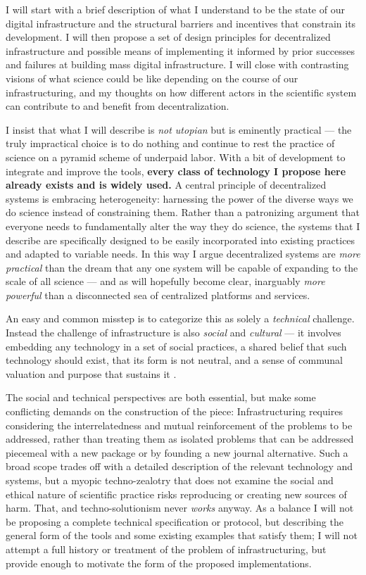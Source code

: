 I will start with a brief description of what I understand to be the
state of our digital infrastructure and the structural barriers and
incentives that constrain its development. I will then propose a set of
design principles for decentralized infrastructure and possible means of
implementing it informed by prior successes and failures at building
mass digital infrastructure. I will close with contrasting visions of
what science could be like depending on the course of our
infrastructuring, and my thoughts on how different actors in the
scientific system can contribute to and benefit from decentralization.

I insist that what I will describe is \emph{not utopian} but is
eminently practical --- the truly impractical choice is to do nothing
and continue to rest the practice of science on a pyramid scheme \citep{ponziSciencePyramidScheme2020}  of underpaid labor. With a bit
of development to integrate and improve the tools, \textbf{every class
of technology I propose here already exists and is widely used.} A
central principle of decentralized systems is embracing heterogeneity:
harnessing the power of the diverse ways we do science instead of
constraining them. Rather than a patronizing argument that everyone
needs to fundamentally alter the way they do science, the systems that I
describe are specifically designed to be easily incorporated into
existing practices and adapted to variable needs. In this way I argue
decentralized systems are \emph{more practical} than the dream that any
one system will be capable of expanding to the scale of all science ---
and as will hopefully become clear, inarguably \emph{more powerful} than
a disconnected sea of centralized platforms and services.

An easy and common misstep is to categorize this as solely a
\emph{technical} challenge. Instead the challenge of infrastructure is
also \emph{social} and \emph{cultural} --- it involves embedding any
technology in a set of social practices, a shared belief that such
technology should exist, that its form is not neutral, and a sense of
communal valuation and purpose that sustains it \citep{bietzSustainingDevelopmentCyberinfrastructure2012} .

The social and technical perspectives are both essential, but make some
conflicting demands on the construction of the piece: Infrastructuring
requires considering the interrelatedness and mutual reinforcement of
the problems to be addressed, rather than treating them as isolated
problems that can be addressed piecemeal with a new package or by
founding a new journal alternative. Such a broad scope trades off with a
detailed description of the relevant technology and systems, but a
myopic techno-zealotry that does not examine the social and ethical
nature of scientific practice risks reproducing or creating new sources
of harm. That, and techno-solutionism never \emph{works} anyway. As a
balance I will not be proposing a complete technical specification or
protocol, but describing the general form of the tools and some existing
examples that satisfy them; I will not attempt a full history or
treatment of the problem of infrastructuring, but provide enough to
motivate the form of the proposed implementations.

